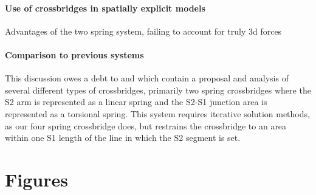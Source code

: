 \documentclass[]{article}
\begin{document}
\paragraph{Use of crossbridges in spatially explicit models} %
Advantages of the two spring system, failing to account for truly 3d forces

\paragraph{Comparison to previous systems} %
This discussion owes a debt to \citet{Schoenberg:1980:p1802} and \citet{Schoenberg:1980:p1627} which contain a proposal and analysis of several different types of crossbridges, primarily two spring crossbridges where the S2 arm is represented as a linear spring and the S2-S1 junction area is represented as a torsional spring. 
This system requires iterative solution methods, as our four spring crossbridge does, but restrains the crossbridge to an area within one S1 length of the line in which the S2 segment is set.



\clearpage
\section{Figures} %
\end{document}
